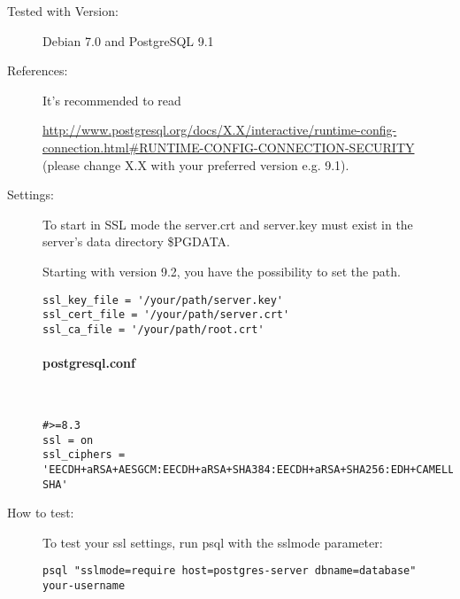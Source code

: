\begin{description}
\item[Tested with Version:] Debian 7.0 and PostgreSQL 9.1

\item[References:]

It's recommended to read 

{\small \url{http://www.postgresql.org/docs/X.X/interactive/runtime-config-connection.html\#RUNTIME-CONFIG-CONNECTION-SECURITY}}
(please change X.X with your preferred version e.g. 9.1).

\item[Settings:] \mbox{}


To start in SSL mode the server.crt and server.key must exist in the server's data directory \$PGDATA. 

Starting with version 9.2, you have the possibility to set the path.

\begin{lstlisting}
ssl_key_file = '/your/path/server.key'
ssl_cert_file = '/your/path/server.crt'
ssl_ca_file = '/your/path/root.crt'
\end{lstlisting}

\paragraph*{postgresql.conf}\mbox{}\\

\begin{lstlisting}
#>=8.3
ssl = on 
ssl_ciphers = 'EECDH+aRSA+AESGCM:EECDH+aRSA+SHA384:EECDH+aRSA+SHA256:EDH+CAMELLIA256:EECDH:EDH+aRSA:+SSLv3:!aNULL:!eNULL:!LOW:!3DES:!MD5:!EXP:!PSK:!SRP:!DSS:!RC4:!SEED:!AES128:!CAMELLIA128:!ECDSA:AES256-SHA'
\end{lstlisting}



\item[How to test:]
To test your ssl settings, run psql with the sslmode parameter:
\begin{lstlisting}
psql "sslmode=require host=postgres-server dbname=database" your-username
\end{lstlisting}

\end{description}

